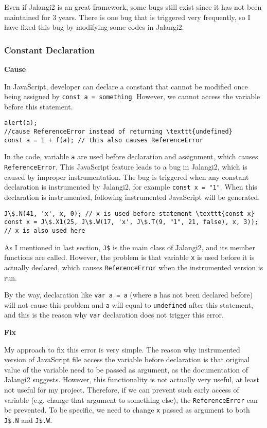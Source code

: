 Even if Jalangi2 is an great framework, some bugs still exist since it has not been maintained for 3 years. There is one bug that is triggered very frequently, so I have fixed this bug by modifying some codes in Jalangi2.

\subsubsection{Constant Declaration}

\textbf{Cause}

In JavaScript, developer can declare a constant that cannot be modified once being assigned by \texttt{const a = something}. However, we cannot access the variable before this statement.

\begin{verbatim}
alert(a); 
//cause ReferenceError instead of returning \texttt{undefined}
const a = 1 + f(a); // this also causes ReferenceError 
\end{verbatim}


In the code, variable \texttt{a} are used before declaration and assignment, which causes \texttt{ReferenceError}. This JavaScript feature leads to a bug in Jalangi2, which is caused by improper instrumentation. The bug is triggered when any constant declaration is instrumented by Jalangi2, for example \texttt{const x = "1"}. When this declaration is instrumented, following instrumented JavaScript will be generated.

\begin{verbatim}
J\$.N(41, 'x', x, 0); // x is used before statement \texttt{const x}
const x = J\$.X1(25, J\$.W(17, 'x', J\$.T(9, "1", 21, false), x, 3)); // x is also used here
\end{verbatim}


As I mentioned in last section, \texttt{J\$} is the main class of Jalangi2, and its member functions are called. However, the problem is that variable \texttt{x} is used before it is actually declared, which causes \texttt{ReferenceError} when the instrumented version is run. 

By the way, declaration like \texttt{var a = a} (where \texttt{a} has not been declared before) will not cause this problem and \texttt{a} will equal to \texttt{undefined} after this statement, and this is the reason why \texttt{var} declaration does not trigger this error.

\textbf{Fix}

My approach to fix this error is very simple. The reason why instrumented version of JavaScript file access the variable before declaration is that original value of the variable need to be passed as argument, as the documentation of Jalangi2 suggests. However, this functionality is not actually very useful, at least not useful for my project. Therefore, if we can prevent such early access of variable (e.g. change that argument to something else), the \texttt{ReferenceError} can be prevented. To be specific, we need to change \texttt{x} passed as argument to both \texttt{J\$.N} and \texttt{J\$.W}.

